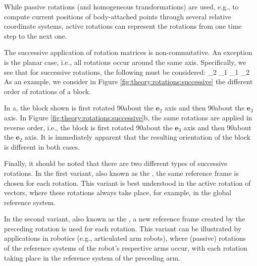 While passive rotations (and homogeneous transformations) are used, e.g., to compute current positions of body-attached points through several relative coordinate systems, active rotations can represent the rotations from one time step to the next one.

%
The successive application of rotation matrices is non-commutative. An exception is the planar case, i.e., all rotations occur around the same axis.
Specifically, we see that for successive rotations, the following must be considered:
\be
  \Am_2 \Am_1 \vv \neq \Am_1 \Am_2 \vv \eqDot
\ee
As an example, we consider in Figure \ref{fig:theory:rotations:successive} the different order of rotations of a block.
%
%

In a, the block shown is first rotated 90\textdegree about the $\mathbf{e}_2$ axis and then 90\textdegree about the $\mathbf{e}_3$ axis. In Figure \ref{fig:theory:rotations:successive}b, the same rotations are applied in reverse order, i.e., the block is first rotated 90\textdegree about the $\mathbf{e}_3$ axis and then 90\textdegree about the $\mathbf{e}_2$ axis. It is immediately apparent that the resulting orientation of the block is different in both cases.
%
%

Finally, it should be noted that there are two different types of successive rotations.
In the first variant, also known as the , the same reference frame is chosen for each rotation. This variant is best understood in the active rotation of vectors, where these rotations always take place, for example, in the global reference system.

In the second variant, also known as the , a new reference frame created by the preceding rotation is used for each rotation. This variant can be illustrated by applications in robotics (e.g., articulated arm robots), where (passive) rotations of the reference systems of the robot's respective arms occur, with each rotation taking place in the reference system of the preceding arm.


